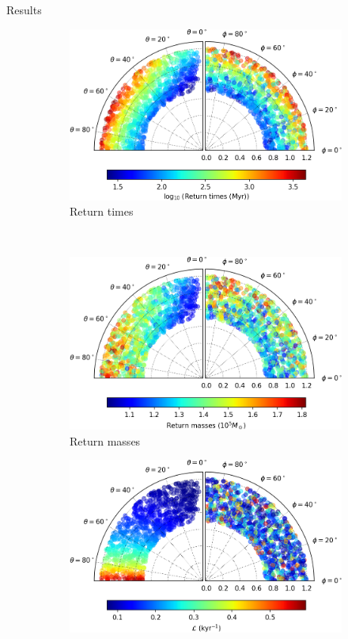 \documentclass{beamer}
\begin{document}
\begin{frame}{Results}
	\begin{figure}[h]
		\centering
		\begin{subfigure}[t]{0.35\textwidth}
			\includegraphics[width = \textwidth]{"../Files/Week 13/images/3_time"}
			\caption{Return times}
		\end{subfigure}
		~ 
		\begin{subfigure}[t]{0.35\textwidth}
			\includegraphics[width=\textwidth]{"../Files/Week 13/images/3_mass"}
			\caption{Return masses}
		\end{subfigure}
		\begin{subfigure}[t]{0.35\textwidth}
			\includegraphics[width=\textwidth]{"../Files/Week 13/images/3_lyapunov"}

\end{subfigure}
\end{figure}
\end{frame}
\end{document}
